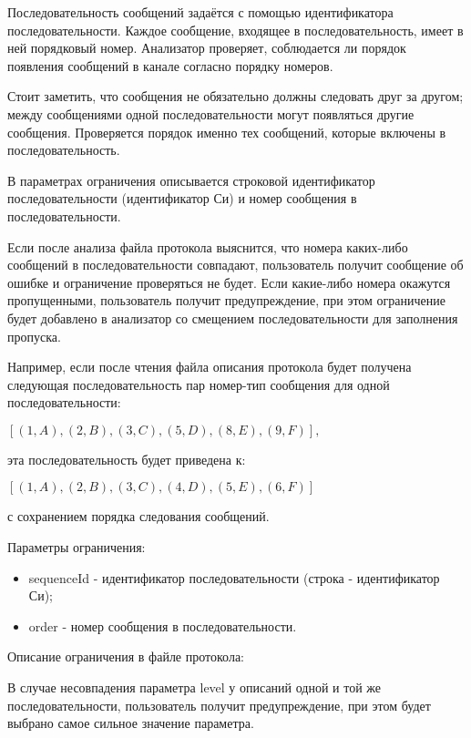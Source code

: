 Последовательность сообщений задаётся с помощью идентификатора 
последовательности. Каждое сообщение, входящее в последовательность, имеет в 
ней порядковый номер. Анализатор проверяет, соблюдается ли порядок появления 
сообщений в канале согласно порядку номеров.

Стоит заметить, что сообщения не обязательно должны следовать друг за другом; 
между сообщениями одной последовательности могут появляться другие сообщения. 
Проверяется порядок именно тех сообщений, которые включены в последовательность.

В параметрах ограничения описывается строковой идентификатор последовательности 
(идентификатор Си) и номер сообщения в последовательности. 

Если после анализа файла протокола выяснится, что номера каких-либо сообщений в 
последовательности совпадают, пользователь получит сообщение об ошибке и 
ограничение проверяться не будет. Если какие-либо номера окажутся пропущенными, 
пользователь получит предупреждение, при этом ограничение будет добавлено в 
анализатор со смещением последовательности для заполнения пропуска.

Например, если после чтения файла описания протокола будет получена следующая 
последовательность пар номер-тип сообщения для одной последовательности:

$
[ (1, A), (2, B), (3, C), (5, D), (8, E), (9, F) ],
$

эта последовательность будет приведена к:

$
[ (1, A), (2, B), (3, C), (4, D), (5, E), (6, F) ]
$

с сохранением порядка следования сообщений.

Параметры ограничения:

\begin{itemize}
 \item sequenceId - идентификатор последовательности (строка - идентификатор 
Си);
 \item order - номер сообщения в последовательности.
\end{itemize}

Описание ограничения в файле протокола:



В случае несовпадения параметра level у описаний одной и той же 
последовательности, пользователь получит предупреждение, при этом будет выбрано 
самое сильное значение параметра.


